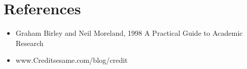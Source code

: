\documentclass[12pt,]{article}
\begin{document}
\section{References}
\begin{itemize}
\item Graham Birley and Neil Moreland, 1998 A Practical Guide to Academic Research 
\item www.Creditsesame.com/blog/credit
\end{itemize}
\end{document}
